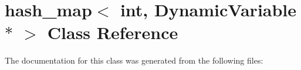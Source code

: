 \hypertarget{classhash__map_3_01int_00_01DynamicVariable_01_5_01_4}{
\section{hash\_\-map$<$ int, Dynamic\-Variable $\ast$ $>$ Class Reference}
\label{classhash__map_3_01int_00_01DynamicVariable_01_5_01_4}
}


The documentation for this class was generated from the following files: